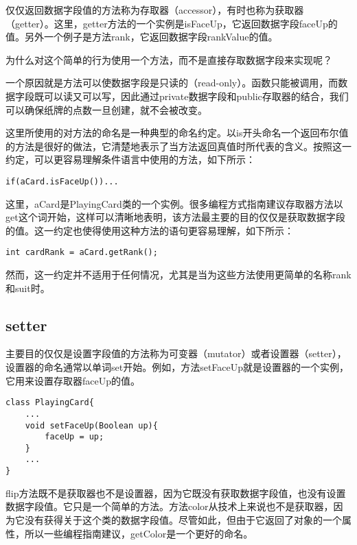 仅仅返回数据字段值的方法称为存取器（accessor），有时也称为获取器（getter）。这里，getter方法的一个实例是isFaceUp，它返回数据字段faceUp的值。另外一个例子是方法rank，它返回数据字段rankValue的值。


为什么对这个简单的行为使用一个方法，而不是直接存取数据字段来实现呢？

一个原因就是方法可以使数据字段是只读的（read-only）。函数只能被调用，而数据字段既可以读又可以写，因此通过private数据字段和public存取器的结合，我们可以确保纸牌的点数一旦创建，就不会被改变。


这里所使用的对方法的命名是一种典型的命名约定。以is开头命名一个返回布尔值的方法是很好的做法，它清楚地表示了当方法返回真值时所代表的含义。按照这一约定，可以更容易理解条件语言中使用的方法，如下所示：

\begin{lstlisting}[language={[Sharp]C}]
if(aCard.isFaceUp())...
\end{lstlisting}


这里，aCard是PlayingCard类的一个实例。很多编程方式指南建议存取器方法以get这个词开始，这样可以清晰地表明，该方法最主要的目的仅仅是获取数据字段的值。这一约定也使得使用这种方法的语句更容易理解，如下所示：



\begin{lstlisting}[language={[Sharp]C}]
int cardRank = aCard.getRank();
\end{lstlisting}

然而，这一约定并不适用于任何情况，尤其是当为这些方法使用更简单的名称rank和suit时。

\subsection{setter}


主要目的仅仅是设置字段值的方法称为可变器（mutator）或者设置器（setter），设置器的命名通常以单词set开始。例如，方法setFaceUp就是设置器的一个实例，它用来设置存取器faceUp的值。


\begin{lstlisting}[language={[Sharp]C}]
class PlayingCard{
	...
	void setFaceUp(Boolean up){
		faceUp = up;
	}
	...
}
\end{lstlisting}

flip方法既不是获取器也不是设置器，因为它既没有获取数据字段值，也没有设置数据字段值。它只是一个简单的方法。方法color从技术上来说也不是获取器，因为它没有获得关于这个类的数据字段值。尽管如此，但由于它返回了对象的一个属性，所以一些编程指南建议，getColor是一个更好的命名。


